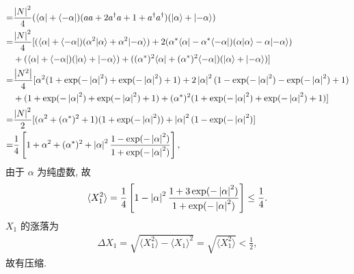 \documentclass{assignment}
\begin{document}
\begin{sol}
\begin{itemize}
\begin{align}
            \notag=&\frac{\left\lvert N\right\rvert^2}{4}(\langle\alpha\rvert+\langle-\alpha\rvert)(aa+2a^{\dagger}a+1+a^{\dagger}a^{\dagger})(\lvert\alpha\rangle+\lvert-\alpha\rangle)\\
            \notag=&\frac{\left\lvert N\right\rvert^2}{4}[(\langle\alpha\rvert+\langle-\alpha\rvert)(\alpha^2\lvert\alpha\rangle+\alpha^2\lvert-\alpha\rangle)+2(\alpha^*\langle\alpha\rvert-\alpha^*\langle-\alpha\rvert)(\alpha\lvert\alpha\rangle-\alpha\lvert-\alpha\rangle)\\
            \notag&+(\langle\alpha\rvert+\langle-\alpha\rvert)(\lvert\alpha\rangle+\lvert-\alpha\rangle)+((\alpha^*)^2\langle\alpha\rvert+(\alpha^*)^2\langle-\alpha\rvert)(\lvert\alpha\rangle+\lvert-\alpha\rangle)]\\
            \notag=&\frac{\left\lvert N^2\right\rvert}{4}[\alpha^2(1+\exp(-\left\lvert\alpha\right\rvert^2)+\exp(-\left\lvert\alpha\right\rvert^2)+1)+2\left\lvert\alpha\right\rvert^2(1-\exp(-\left\lvert\alpha\right\rvert^2)-\exp(-\left\lvert\alpha\right\rvert^2)+1)\\
            \notag&+(1+\exp(-\left\lvert\alpha\right\rvert^2)+\exp(-\left\lvert\alpha\right\rvert^2)+1)+(\alpha^*)^2(1+\exp(-\left\lvert\alpha\right\rvert^2)+\exp(-\left\lvert\alpha\right\rvert^2)+1)]\\
            \notag=&\frac{\left\lvert N\right\rvert^2}{2}[(\alpha^2+(\alpha^*)^2+1)(1+\exp(-\left\lvert\alpha\right\rvert^2))+\left\lvert\alpha\right\rvert^2(1-\exp(-\left\lvert\alpha\right\rvert^2)]\\
            =&\frac{1}{4}\left[1+\alpha^2+(\alpha^*)^2+\left\lvert\alpha\right\rvert^2\frac{1-\exp(-\left\lvert\alpha\right\rvert^2)}{1+\exp(-\left\lvert\alpha\right\rvert^2)}\right],
        \end{align}
        由于 $\alpha$ 为纯虚数, 故
        \begin{align}
            \langle X_1^2\rangle=\frac{1}{4}\left[1-\left\lvert\alpha\right\rvert^2\frac{1+3\exp(-\left\lvert\alpha\right\rvert^2)}{1+\exp(-\left\lvert\alpha\right\rvert^2)}\right]\leq\frac{1}{4}.
        \end{align}
        $X_1$ 的涨落为
        \begin{align}
            \Delta X_1=\sqrt{\langle X_1^2\rangle-\langle X_1\rangle^2}=\sqrt{\langle X_1^2\rangle}<\frac{1}{2},
        \end{align}
        故有压缩.
    \end{itemize}
\end{sol}
\end{document}
